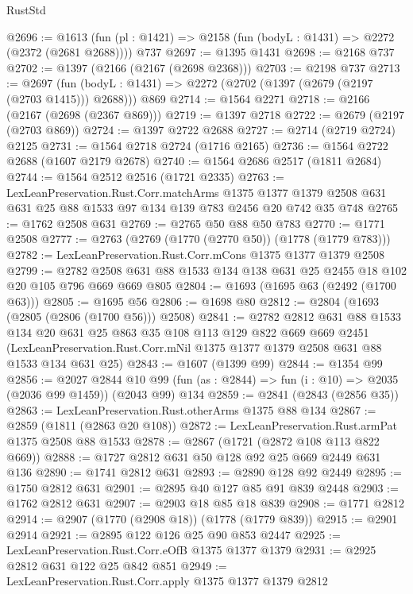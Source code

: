 \begin{lexlean}{RustStd}
\begin{coremodule}
@2696 := @1613 (fun (pl : @1421) => @2158 (fun (bodyL : @1431) => @2272 (@2372 (@2681 @2688)))) @737
@2697 := @1395 @1431
@2698 := @2168 @737
@2702 := @1397 (@2166 (@2167 (@2698 @2368)))
@2703 := @2198 @737
@2713 := @2697
    (fun (bodyL : @1431) => @2272 (@2702 (@1397 (@2679 (@2197 (@2703 @1415))) @2688)))
    @869
@2714 := @1564 @2271
@2718 := @2166 (@2167 (@2698 (@2367 @869)))
@2719 := @1397 @2718
@2722 := @2679 (@2197 (@2703 @869))
@2724 := @1397 @2722 @2688
@2727 := @2714 (@2719 @2724) @2125
@2731 := @1564 @2718 @2724 (@1716 @2165)
@2736 := @1564 @2722 @2688 (@1607 @2179 @2678)
@2740 := @1564 @2686 @2517 (@1811 @2684)
@2744 := @1564 @2512 @2516 (@1721 @2335)
@2763 := LexLeanPreservation.Rust.Corr.matchArms
    @1375
    @1377
    @1379
    @2508
    @631
    @631
    @25
    @88
    @1533
    @97
    @134
    @139
    @783
    @2456
    @20
    @742
    @35
    @748
@2765 := @1762 @2508 @631
@2769 := @2765 @50 @88 @50 @783
@2770 := @1771 @2508
@2777 := @2763 (@2769 (@1770 (@2770 @50)) (@1778 (@1779 @783)))
@2782 := LexLeanPreservation.Rust.Corr.mCons @1375 @1377 @1379 @2508
@2799 := @2782 @2508 @631 @88 @1533 @134 @138 @631 @25 @2455 @18 @102 @20 @105 @796 @669 @669 @805
@2804 := @1693 (@1695 @63 (@2492 (@1700 @63)))
@2805 := @1695 @56
@2806 := @1698 @80
@2812 := @2804 (@1693 (@2805 (@2806 (@1700 @56))) @2508)
@2841 := @2782
    @2812
    @631
    @88
    @1533
    @134
    @20
    @631
    @25
    @863
    @35
    @108
    @113
    @129
    @822
    @669
    @669
    @2451
    (LexLeanPreservation.Rust.Corr.mNil @1375 @1377 @1379 @2508 @631 @88 @1533 @134 @631 @25)
@2843 := @1607 (@1399 @99)
@2844 := @1354 @99
@2856 := @2027
    @2844
    @10
    @99
    (fun (as : @2844) => fun (i : @10) => @2035 (@2036 @99 @1459))
    (@2043 @99)
    @134
@2859 := @2841 (@2843 (@2856 @35))
@2863 := LexLeanPreservation.Rust.otherArms @1375 @88 @134
@2867 := @2859 (@1811 (@2863 @20 @108))
@2872 := LexLeanPreservation.Rust.armPat @1375 @2508 @88 @1533
@2878 := @2867 (@1721 (@2872 @108 @113 @822 @669))
@2888 := @1727 @2812 @631 @50 @128 @92 @25 @669 @2449 @631 @136
@2890 := @1741 @2812 @631
@2893 := @2890 @128 @92 @2449
@2895 := @1750 @2812 @631
@2901 := @2895 @40 @127 @85 @91 @839 @2448
@2903 := @1762 @2812 @631
@2907 := @2903 @18 @85 @18 @839
@2908 := @1771 @2812
@2914 := @2907 (@1770 (@2908 @18)) (@1778 (@1779 @839))
@2915 := @2901 @2914
@2921 := @2895 @122 @126 @25 @90 @853 @2447
@2925 := LexLeanPreservation.Rust.Corr.eOfB @1375 @1377 @1379
@2931 := @2925 @2812 @631 @122 @25 @842 @851
@2949 := LexLeanPreservation.Rust.Corr.apply
    @1375
    @1377
    @1379
    @2812

\end{coremodule}
\end{lexlean}
